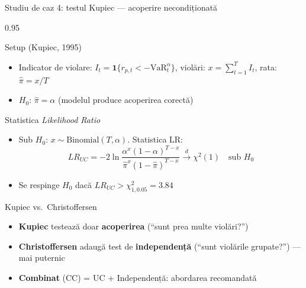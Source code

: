 \documentclass[9pt, aspectratio=169, t]{beamer}
\begin{document}
\begin{frame}{Studiu de caz 4: testul Kupiec --- acoperire necondiționată}
    \begin{cminipage}{0.95\textwidth}
    \vspace{-3mm}
    {\scriptsize
    \begin{block}{Setup (Kupiec, 1995)}
        \begin{itemize}\setlength{\itemsep}{0pt}
            \item Indicator de violare: $I_t = \mathbf{1}\{r_{p,t} < -\text{VaR}_t^\alpha\}$, violări: $x = \sum_{t=1}^T I_t$, rata: $\hat{\pi} = x/T$
            \item $H_0$: $\hat{\pi} = \alpha$ (modelul produce acoperirea corectă)
        \end{itemize}
    \end{block}
    \vspace{-2mm}
    \begin{block}{Statistica \textit{Likelihood Ratio}}
        \begin{itemize}\setlength{\itemsep}{0pt}
            \item Sub $H_0$: $x \sim \text{Binomial}(T, \alpha)$. Statistica LR:
            \vspace{-2mm}
            \[
                LR_{UC} = -2\ln\frac{\alpha^x(1-\alpha)^{T-x}}{\hat{\pi}^x(1-\hat{\pi})^{T-x}} \xrightarrow{d} \chi^2(1) \quad \text{sub } H_0
            \]
            \vspace{-3mm}
            \item Se respinge $H_0$ dacă $LR_{UC} > \chi^2_{1,0.05} = 3.84$
        \end{itemize}
    \end{block}
    \vspace{-2mm}
    \begin{alertblock}{Kupiec vs.\ Christoffersen}
        \begin{itemize}\setlength{\itemsep}{0pt}
            \item \textbf{Kupiec} testează doar \textbf{acoperirea} (``sunt prea multe violări?'')
            \item \textbf{Christoffersen} adaugă test de \textbf{independență} (``sunt violările grupate?'') --- mai puternic
            \item \textbf{Combinat} (CC) = UC + Independență: abordarea recomandată
        \end{itemize}
    \end{alertblock}
    }
    \end{cminipage}
\end{frame}
\end{document}
